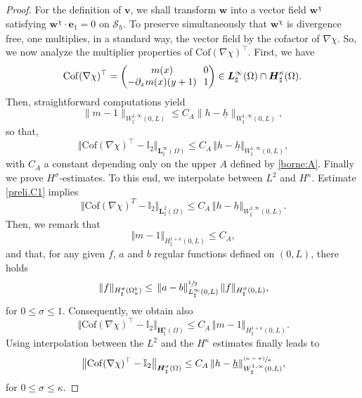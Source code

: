 \documentclass[JEP,XML,SOM,Unicode,NoFloatCountersInSection]{cedram}
\let\mathcal\mathscr
\newcommand{\psfrac}[2]{\sfrac{(#1)}{#2}}
\theoremstyle{remark}
\theoremstyle{definition}
\newcommand{\norme}[1]{\,\Vert #1\Vert}
\newcommand{\bnorme}[1]{\,\bigl\Vert #1\bigr\Vert}
\newcommand{\vg}{\boldsymbol{v}}
\newcommand{\wg}{\boldsymbol{w}}
\newcommand{\BS}[1]{\boldsymbol{#1}}
\let\CM\Omega
\newcommand{\hb}{{\underline{h}}}
\newcommand{\Cof}{\mathrm{Cof}}
\begin{document}
\begin{proof}
For the definition of $\vg$, we shall transform $\wg$ into a vector field $\wg^{\chi}$ satisfying $\wg^{\chi} \cdot \BS{e}_1 = 0$ on $\mathcal S_{\hb}$. To preserve simultaneously that $\wg^{\chi}$ is divergence free, one multiplies, in a standard way, the vector field by the cofactor of $\nabla \chi$. So, we now analyze the multiplier properties of $\Cof(\nabla\chi)^{\top}$. First, we have
\[\arraycolsep3.5pt
\Cof(\nabla\chi)^{\top} = \begin{pmatrix}
m(x)&0\\
-\partial_x m(x)(y+1)&1\\
\end{pmatrix} \in \BS{L}^\infty_\sharp(\Omega)\cap \BS{H}_\sharp^\kappa(\Omega).
\]
Then, straightforward computations yield
\begin{equation} \label{prelim.h}
\|m-1\|_{W^{1,\infty}_{\sharp}(0,L)} \leq C_A \|h-\underline{h}\|_{W^{1,\infty}_{\sharp}(0,L)},
\end{equation}
so that,
\begin{equation}\label{preli.C1}
\norme{\Cof(\nabla\chi)^{\top}-\mathbb I_2}_{\BS{L}^{\infty}_{\sharp}(\CM)}\leq C_A\norme{h-\hb}_{W^{1,\infty}_{\sharp}(0,L)},
\end{equation}
with $C_A$ a constant depending only on the upper $A$ defined by \eqref{borne:A}.
Finally we prove $H^{\sigma}$-estimates.
To this end, we interpolate between $L^2$ and $H^\kappa$. Estimate \eqref{preli.C1} implies
\[
\norme{\Cof(\nabla\chi)^{T}-\mathbb I_2}_{\BS{L}^{2}_{\sharp}(\CM)}\leq C_A\norme{h-\hb}_{W^{1,\infty}_{\sharp}(0,L)}.
\]
Then, we remark that
\[
\norme{m-1}_{H^{1+\kappa}_{\sharp}(0,L)}\leq C_{A},
\]
and that, for any given $f$, $a$ and $b$ regular functions defined on $(0,L)$, there holds
\begin{equation}\label{2D.1D.estimate}\norme{f}_{H_\sharp^{\sigma}(\Omega_{a}^{b})}\leq \norme{a-b}_{L_\sharp^{\infty}(0,L)}^{\sfrac{1}{2}}\norme{f}_{H_\sharp^{\sigma}(0,L)},
\end{equation}
for $0\leq \sigma\leq 1$. Consequently, we obtain also
\[\bnorme{\Cof(\nabla\chi)^{\top}-\mathbb I_2}_{\BS{H}^{\kappa}_{\sharp}(\CM)}\leq C_A\norme{m-1}_{H^{1+\kappa}_{\sharp}(0,L)}.
\]
Using interpolation between the $L^{2}$ and the $H^{\kappa}$ estimates finally leads to
\begin{equation}\label{preli.Hs}\bnorme{\Cof(\nabla\chi)^{\top}-\mathbb I_2}_{\BS{H}^{\sigma}_{\sharp}(\CM)}\leq C_A \norme{h-\hb}_{W^{1,\infty}_{\sharp}(0,L)}^{\psfrac{\kappa-\sigma}{\kappa}},
\end{equation}
for $0\leq \sigma\leq \kappa$.


\end{proof}
\end{document}
